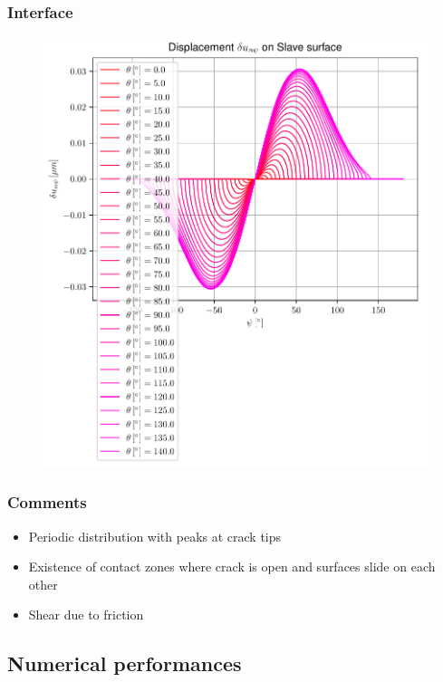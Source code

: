 \documentclass[first,firstsupp,lastsupp,handout,last,hyperref,table]{ETHclass}
\begin{document}
\begin{frame}
\frametitle{\vspace{0.35cm}\scriptsize Interface}
\vspace{-0.85cm}
\begin{figure}
\includegraphics[height=0.9\textheight]{2017-03-03_AbqRunSummary_AllTangentialDispsOnSlave.pdf}
\end{figure}
\end{frame}

\begin{frame}
\frametitle{Comments}
\vspace{-0.25cm}
\begin{itemize}[label=]
\item Periodic distribution with peaks at crack tips
\item Existence of contact zones where crack is open and surfaces slide on each other
\item Shear due to friction
\end{itemize}
\end{frame}

\subsection{Numerical performances}
\end{document}
